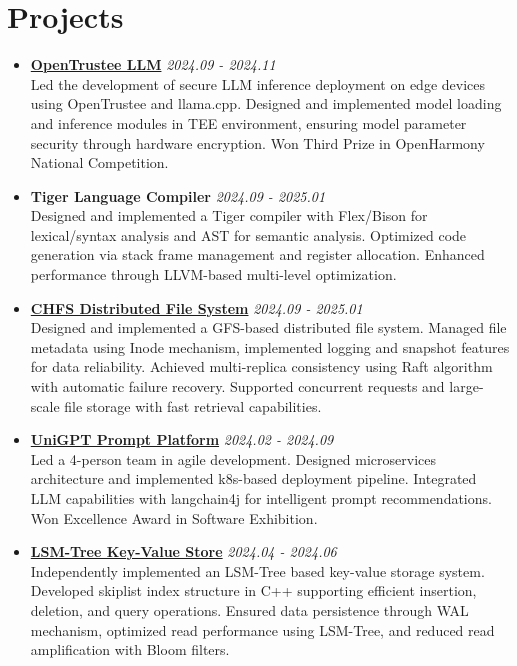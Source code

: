 \documentclass[a4paper]{article}
\begin{document}
\section*{Projects}
\begin{itemize}[leftmargin=*,label={},itemsep=0.3em,topsep=0.1em]
\item \textbf{\href{https://gitee.com/qiweic10/open-trustee_-llm_app}{OpenTrustee LLM}} \hfill \textit{2024.09 - 2024.11}\\
Led the development of secure LLM inference deployment on edge devices using OpenTrustee and llama.cpp. Designed and implemented model loading and inference modules in TEE environment, ensuring model parameter security through hardware encryption. Won Third Prize in OpenHarmony National Competition.

\item \textbf{Tiger Language Compiler} \hfill \textit{2024.09 - 2025.01}\\
Designed and implemented a Tiger compiler with Flex/Bison for lexical/syntax analysis and AST for semantic analysis. Optimized code generation via stack frame management and register allocation. Enhanced performance through LLVM-based multi-level optimization.

\item \textbf{\href{https://github.com/kiwi142857/CSE-chfs}{CHFS Distributed File System}} \hfill \textit{2024.09 - 2025.01}\\
Designed and implemented a GFS-based distributed file system. Managed file metadata using Inode mechanism, implemented logging and snapshot features for data reliability. Achieved multi-replica consistency using Raft algorithm with automatic failure recovery. Supported concurrent requests and large-scale file storage with fast retrieval capabilities.

\item \textbf{\href{https://github.com/UniGPT-SJTU}{UniGPT Prompt Platform}} \hfill \textit{2024.02 - 2024.09}\\
Led a 4-person team in agile development. Designed microservices architecture and implemented k8s-based deployment pipeline. Integrated LLM capabilities with langchain4j for intelligent prompt recommendations. Won Excellence Award in Software Exhibition.

\item \textbf{\href{https://github.com/kiwi142857/LSM-Tree}{LSM-Tree Key-Value Store}} \hfill \textit{2024.04 - 2024.06}\\
Independently implemented an LSM-Tree based key-value storage system. Developed skiplist index structure in C++ supporting efficient insertion, deletion, and query operations. Ensured data persistence through WAL mechanism, optimized read performance using LSM-Tree, and reduced read amplification with Bloom filters.
\end{itemize}
\end{document}
